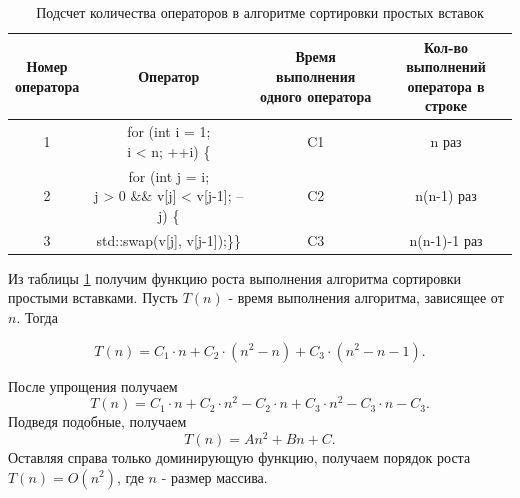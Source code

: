 \documentclass[14pt]{extarticle}
\begin{document}
\begin{table}[htpb]
  \centering
  \caption{Подсчет количества операторов в алгоритме сортировки простых вставок}
  \label{tab:second_alg_speed}
  \begin{tabular}{|c|c|c|c|}
    \hline
    \parbox[m]{2cm}{\centering Номер \\ оператора}
    & Оператор
    & \parbox[m]{2cm}{\centering Время выполнения \\ одного оператора}
    & \parbox[m]{2cm}{\centering Кол-во выполнений \\ оператора в строке}
    \\  & \parbox[m]{4cm}{\centering for (int i = 1;\\ i < n; ++i) \{ }
      & C1 & n раз
    \\  & \parbox[m]{4cm}{\centering for (int j = i;\\ j > 0 \&\& v[j] < v[j-1]; --j) \{ }
        & C2 & n(n-1) раз
    \\  & std::swap(v[j], v[j-1]);\}\} & C3 & n(n-1)-1 раз
    \\ \hline
  \end{tabular}
\end{table}

Из таблицы \ref{tab:second_alg_speed} получим функцию роста выполнения алгоритма
сортировки простыми вставками. Пусть $T(n)$ - время выполнения алгоритма, зависящее
от  $n$. Тогда
 
\[
  T(n) = C_1\cdot n + C_2\cdot (n^2-n) + C_3\cdot (n^2-n-1)
.\] 

После упрощения получаем
\[
  T(n) = C_1\cdot n + C_2\cdot n^2 - C_2 \cdot n + C_3\cdot n^2 - C_3\cdot n
  - C_3
.\] 
Подведя подобные, получаем
\[
  T(n) = An^2+Bn+C
.\] 
Оставляя справа только доминирующую функцию, получаем порядок роста
$T(n) = O(n^2)$, где  $n$ - размер массива.
\end{document}
